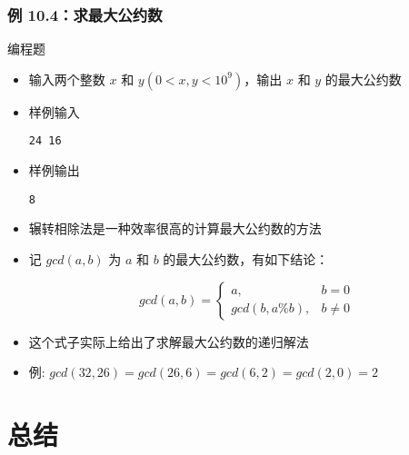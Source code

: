 \begin{frame}[fragile]
    \frametitle{例 10.4：求最大公约数}
     {
        \begin{exampleblock}{编程题}
            \begin{itemize}
                \item 输入两个整数 $x$ 和 $y (0<x,y<10^9)$，输出 $x$ 和 $y$ 的最大公约数
                
                \item 样例输入
    
                    \lstinline|24 16|     

                \item 样例输出
                
                    \lstinline|8|
    
            \end{itemize}
        \end{exampleblock}
    }
     {
        \begin{itemize}
            \item 辗转相除法是一种效率很高的计算最大公约数的方法
            \item 记 $gcd(a, b)$ 为 $a$ 和 $b$ 的最大公约数，有如下结论：
            
            \[
            gcd(a,b) = 
            \begin{cases}
            a, & \text{$b = 0$} \\
            gcd(b, a \% b), & \text{$b \neq 0$}
            \end{cases}
            \]

            \item 这个式子实际上给出了求解最大公约数的递归解法
            \item 例: $gcd(32, 26) = gcd(26, 6) = gcd(6, 2) = gcd(2, 0) = 2$

        \end{itemize}
        
    }
     {
        
    }

\end{frame}


\section{总结}

